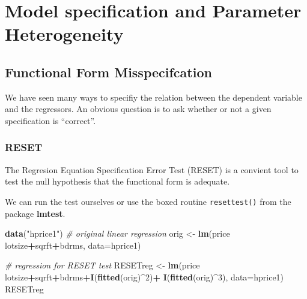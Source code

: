 \documentclass[]{book}
\newenvironment{Shaded}{\begin{snugshade}}{\end{snugshade}}
\newcommand{\CommentTok}[1]{\textcolor[rgb]{0.56,0.35,0.01}{\textit{#1}}}
\newcommand{\DataTypeTok}[1]{\textcolor[rgb]{0.13,0.29,0.53}{#1}}
\newcommand{\DecValTok}[1]{\textcolor[rgb]{0.00,0.00,0.81}{#1}}
\newcommand{\KeywordTok}[1]{\textcolor[rgb]{0.13,0.29,0.53}{\textbf{#1}}}
\newcommand{\NormalTok}[1]{#1}
\newcommand{\OperatorTok}[1]{\textcolor[rgb]{0.81,0.36,0.00}{\textbf{#1}}}
\newcommand{\StringTok}[1]{\textcolor[rgb]{0.31,0.60,0.02}{#1}}
\begin{document}
\hypertarget{model-specification-and-parameter-heterogeneity}{%
\section{Model specification and Parameter
Heterogeneity}\label{model-specification-and-parameter-heterogeneity}}

\hypertarget{functional-form-misspecifcation}{%
\subsection{Functional Form
Misspecifcation}\label{functional-form-misspecifcation}}

We have seen many ways to specifiy the relation between the dependent
variable and the regressors. An obvious question is to ask whether or
not a given specification is ``correct''.

\hypertarget{reset}{%
\subsubsection{RESET}\label{reset}}

The Regresion Equation Specification Error Test (RESET) is a convient
tool to test the null hypothesis that the functional form is adequate.

We can run the test ourselves or use the boxed routine
\texttt{resettest()} from the package \textbf{lmtest}.

\begin{Shaded}
\begin{Highlighting}[]
\KeywordTok{data}\NormalTok{(}\StringTok{"hprice1"}\NormalTok{)}
\CommentTok{# original linear regression}
\NormalTok{orig <-}\StringTok{ }\KeywordTok{lm}\NormalTok{(price }\OperatorTok{~}\StringTok{ }\NormalTok{lotsize}\OperatorTok{+}\NormalTok{sqrft}\OperatorTok{+}\NormalTok{bdrms, }\DataTypeTok{data=}\NormalTok{hprice1)}

\CommentTok{# regression for RESET test}
\NormalTok{RESETreg <-}\StringTok{ }\KeywordTok{lm}\NormalTok{(price }\OperatorTok{~}\StringTok{ }\NormalTok{lotsize}\OperatorTok{+}\NormalTok{sqrft}\OperatorTok{+}\NormalTok{bdrms}\OperatorTok{+}\KeywordTok{I}\NormalTok{(}\KeywordTok{fitted}\NormalTok{(orig)}\OperatorTok{^}\DecValTok{2}\NormalTok{)}\OperatorTok{+}\StringTok{ }
\StringTok{                 }\KeywordTok{I}\NormalTok{(}\KeywordTok{fitted}\NormalTok{(orig)}\OperatorTok{^}\DecValTok{3}\NormalTok{), }\DataTypeTok{data=}\NormalTok{hprice1)}
\NormalTok{RESETreg}
\end{Highlighting}
\end{Shaded}
\end{document}
